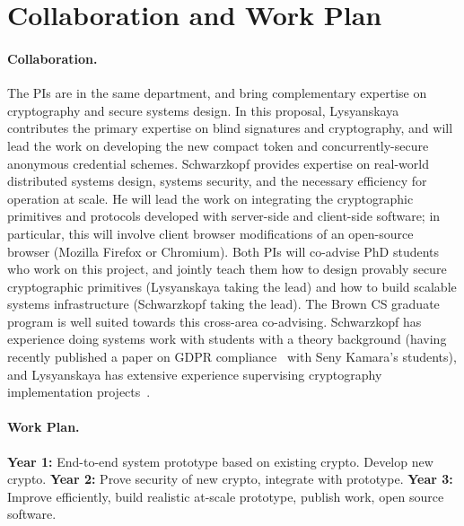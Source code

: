 \section{Collaboration and Work Plan}

\paragraph{Collaboration.}
%
The PIs are in the same department, and bring complementary expertise on cryptography and secure systems design.
%
In this proposal, Lysyanskaya contributes the primary expertise on blind signatures and cryptography, and will lead the work on developing the new compact token and concurrently-secure anonymous credential schemes.
%
Schwarzkopf provides expertise on real-world distributed systems design, systems security, and the necessary efficiency for operation at scale.
%
He will lead the work on integrating the cryptographic primitives and protocols developed with server-side and client-side software; in particular, this will involve client browser modifications of an open-source browser (Mozilla Firefox or Chromium).
%
Both PIs will co-advise PhD students who work on this project, and jointly teach them how to design provably secure cryptographic primitives (Lysyanskaya taking the lead) and how to build scalable systems infrastructure (Schwarzkopf taking the lead).
%
The Brown CS graduate program is well suited towards this cross-area co-advising.
%
Schwarzkopf has experience doing systems work with students with a theory background (\eg having recently published a paper on GDPR compliance~\cite{gdprizer} with Seny Kamara's students), and Lysyanskaya has extensive experience supervising cryptography implementation projects~\cite{mekhl10,bhrlpb12,hzblpb13,bcdlrsy17}. 
%

\paragraph{Work Plan.}
%
\textbf{Year 1:} End-to-end system prototype based on existing crypto. Develop new crypto.
%
\textbf{Year 2:} Prove security of new crypto, integrate with prototype.
%
\textbf{Year 3:} Improve efficiently, build realistic at-scale prototype, publish work, open source software.
%
